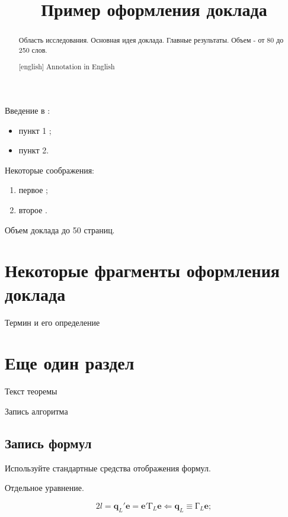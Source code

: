 \documentclass[utf8]{../IncArticle}
\title{Пример оформления доклада}
\date{}
\begin{document}
\begin{abstract}
Область исследования. Основная идея доклада. Главные результаты. Объем - от 80 до 250 слов.
\end{abstract}

\begin{abstract}[english]
Annotation in English
\end{abstract}

\introduction
Введение в :

\begin{itemize}
\item пункт 1 \cite{m1};
\item пункт 2.
\end{itemize}

Некоторые соображения:
\begin{enumerate}
\item первое \cite{m2};
\item второе \cite{m3}.
\end{enumerate}
Объем доклада до 50 страниц.

\section{Некоторые фрагменты оформления доклада}


\begin{definition}
Термин и его определение
\end{definition}

\section{Еще один раздел}

\begin{theorem}
Текст теоремы
\end{theorem}

\begin{algorithm}
Запись алгоритма
\end{algorithm}

\subsection{Запись формул}
Используйте стандартные средства отображения формул.

Отдельное уравнение.

\begin{equation}%
2l = \bm{q}_{L}{'}\bm{e} = \bm{e}{'}\textbf{Г}_{L}\bm{e}\Leftarrow\bm{q}_{L}\equiv\textbf{Г}_{L}\bm{e};
\end{equation}
\end{document}
